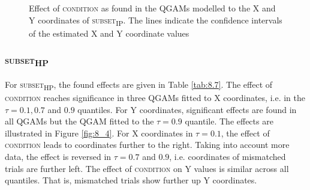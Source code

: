 \begin{figure}
    \centering
    
    \caption{Effect of \textsc{condition} as found in the QGAMs modelled to the X and Y coordinates of \textsc{subset\textsubscript{IP}}. The lines indicate the confidence intervals of the estimated X and Y coordinate values}
    \label{fig:8_3}
\end{figure}

\subsubsection{\textsc{subset\textsubscript{HP}}}\label{section08_2_2_2}

For \textsc{subset\textsubscript{HP}}, the found effects are given in Table \ref{tab:8.7}. The effect of \textsc{condition} reaches significance in three QGAMs fitted to X coordinates, i.e. in the $\tau=0.1,0.7$ and $0.9$ quantiles. For Y coordinates, significant effects are found in all QGAMs but the QGAM fitted to the $\tau=0.9$ quantile. The effects are illustrated in Figure \ref{fig:8_4}. For X coordinates in $\tau=0.1$, the effect of \textsc{condition} leads to coordinates further to the right. Taking into account more data, the effect is reversed in $\tau=0.7$ and $0.9$, i.e. coordinates of mismatched trials are further left. The effect of \textsc{condition} on Y values is similar across all quantiles. That is, mismatched trials show further up Y coordinates.

